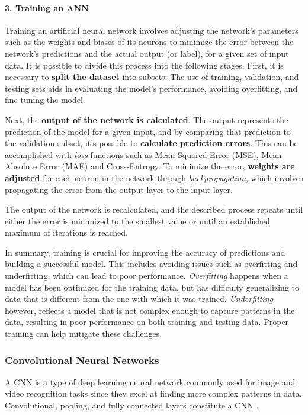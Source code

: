    
\paragraph{3. Training an ANN}
Training an artificial neural network involves adjusting the network's parameters such as the weights and biases of its neurons to minimize the error between the network's predictions and the actual output (or label), for a given set of input data. %
It is possible to divide this process into the following stages. First, it is necessary to \textbf{split the dataset} into subsets. 
The use of training, validation, and testing sets aids in evaluating the model's performance, avoiding overfitting, and fine-tuning the model.

Next, the \textbf{output of the network is calculated}. The output represents the prediction of the model for a given input, and by comparing that prediction to the validation subset, it's possible to \textbf{calculate prediction errors}. This can be accomplished with \textit{loss} functions such as Mean Squared Error (MSE), Mean Absolute Error (MAE) and Cross-Entropy.
To minimize the error, \textbf{weights are adjusted} for each neuron in the network through \textit{backpropagation}, which involves propagating the error from the output layer to the input layer.

The output of the network is recalculated, and the described process repeats until either the error is minimized to the smallest value or until an established maximum of iterations is reached.

In summary, training is crucial for improving the accuracy of predictions and building a successful model. This includes avoiding issues such as overfitting and underfitting, which can lead to poor performance. \textit{Overfitting} happens when a model has been optimized for the training data, but has difficulty generalizing to data that is different from the one with which it was trained. \textit{Underfitting} however, reflects a model that is not complex enough to capture patterns in the data, resulting in poor performance on both training and testing data. Proper training can help mitigate these challenges.


\subsubsection{Convolutional Neural Networks}
\label{subsubsec:CNNs}
A \gls{CNN} is a type of deep learning neural network commonly used for image and video recognition tasks since they excel at finding more complex patterns in data. Convolutional, pooling, and fully connected layers constitute a CNN \cite{CNNs_intro}. 

